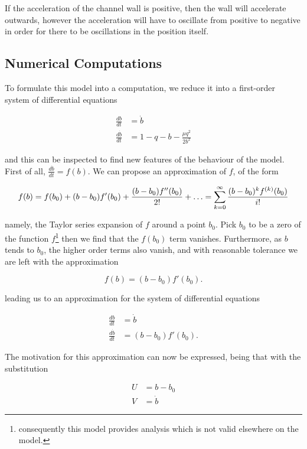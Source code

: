 \documentclass{article}
\begin{document}
If the acceleration of the channel wall is positive, then the wall will accelerate outwards,
however the acceleration will have to oscillate from positive to negative in order for there to be oscillations in the position itself.

\subsection{Numerical Computations}

To formulate this model into a computation, we reduce it into a first-order system of differential equations

\begin{align}
    \frac{db}{dt} &= \dot{b} \\
    \frac{d\dot{b}}{dt} &= 1 - q - b - \frac{\mu q^2}{2b^2}
\end{align}

and this can be inspected to find new features of the behaviour of the model.
First of all, $\frac{d\dot{b}}{dt} = f(b)$.
We can propose an approximation of $f$, of the form

\begin{equation*}
    f(b) = f(b_0) + (b-b_0)f'(b_0) + \frac{(b-b_0)f''(b_0)}{2!} + \mathellipsis = \sum_{k=0}^\infty\frac{(b-b_0)^{k}f^{(k)}(b_0)}{i!}
\end{equation*}

namely, the Taylor series expansion of $f$ around a point $b_0$.
Pick $b_0$ to be a zero of the function $f$\footnote{consequently this model provides analysis which is not valid elsewhere on the model.}
then we find that the $f(b_0)$ term vanishes.
Furthermore, as $b$ tends to $b_0$, the higher order terms also vanish,
and with reasonable tolerance we are left with the approximation

\begin{equation}
    f(b) = (b-b_0)f'(b_0).
\end{equation}

leading us to an approximation for the system of differential equations

\begin{align}
    \frac{db}{dt} &= \dot{b} \\
    \frac{d\dot{b}}{dt} &= (b-b_0)f'(b_0).
\end{align}

The motivation for this approximation can now be expressed,
being that with the substitution

\begin{align}
    U &= b - b_0 \\
    V &= \dot{b}
\end{align}
\end{document}
